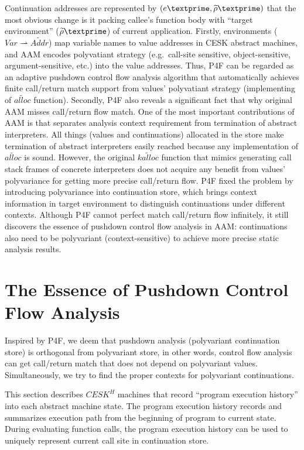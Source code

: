 \documentclass{article}
\begin{document}
Continuation addresses are represented by $(e\textprime, \widetilde{\rho}\textprime)$ that the most obvious change is it packing callee's function body with ``target environment'' ($\widetilde{\rho}\textprime$) of current application.
Firstly, environments ($Var \rightharpoonup \widetilde{Addr}$) map variable names to value addresses in CESK abstract machines, and AAM encodes polyvatiant strategy (e.g.\ call-site sensitive, object-sensitive, argument-sensitive, etc.) into the value addresses. Thus, P4F can be regarded as an adaptive pushdown control flow analysis algorithm that automatically achieves finite call/return match support from values' polyvatiant strategy (implementing of $\widetilde{alloc}$ function).
Secondly, P4F also reveals a significant fact that why original AAM misses call/return flow match. One of the most important contributions of AAM is that separates analysis context requirement from termination of abstract interpreters. All things (values and continuations) allocated in the store make termination of abstract interpreters easily reached because any implementation of $\widetilde{alloc}$ is sound.
However, the original $\widetilde{kalloc}$ function that mimics generating call stack frames of concrete interpreters does not acquire any benefit from values' polyvariance for getting more precise call/return flow. P4F fixed the problem by introducing polyvariance into continuation store, which brings context information in target environment to distinguish continuations under different contexts. Although P4F cannot perfect match call/return flow infinitely, it still discovers the essence of pushdown control flow analysis in AAM\@: continuations also need to be polyvariant (context-sensitive) to achieve more precise static analysis results.

\section{The Essence of Pushdown Control Flow Analysis}
\label{sec:The Essence of Pushdown Control Flow Analysis}
Inspired by P4F, we deem that pushdown analysis (polyvariant continuation store) is orthogonal from polyvariant store, in other words, control flow analysis can get call/return match that does not depend on polyvariant values. Simultaneously, we try to find the proper contexts for polyvariant continuations.

This section describes $CESK^H$ machines that record ``program execution history'' into each abstract machine state.
The program execution history records and summarizes execution path from the beginning of program to current state.
During evaluating function calls, the program execution history can be used to uniquely represent current call site in continuation store.
\end{document}
